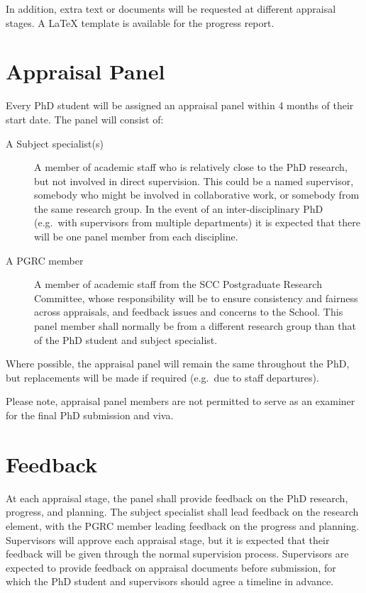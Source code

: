\documentclass[12pt,a4paper]{article}
\begin{document}
In addition, extra text or documents will be requested at different appraisal stages. A \LaTeX{} template is available for the progress report.

\section{Appraisal Panel}
Every PhD student will be assigned an appraisal panel within 4 months of their start date. The panel will consist of:
\begin{description}
	\item[A Subject specialist(s)] A member of academic staff who is relatively close to the PhD research, but not involved in direct supervision. This could be a named supervisor, somebody who might be involved in collaborative work, or somebody from the same research group. In the event of an inter-disciplinary PhD (e.g.\ with supervisors from multiple departments) it is expected that there will be one panel member from each discipline.
	\item[A PGRC member] A member of academic staff from the SCC Postgraduate Research Committee, whose responsibility will be to ensure consistency and fairness across appraisals, and feedback issues and concerns to the School. This panel member shall normally be from a different research group than that of the PhD student and subject specialist.
\end{description}

Where possible, the appraisal panel will remain the same throughout the PhD, but replacements will be made if required (e.g.\ due to staff departures).

Please note, appraisal panel members are not permitted to serve as an examiner for the final PhD submission and viva.


\section{Feedback}
At each appraisal stage, the panel shall provide feedback on the PhD research, progress, and planning. The subject specialist shall lead feedback on the research element, with the PGRC member leading feedback on the progress and planning. Supervisors will approve each appraisal stage, but it is expected that their feedback will be given through the normal supervision process. Supervisors are expected to provide feedback on appraisal documents before submission, for which the PhD student and supervisors should agree a timeline in advance.
\end{document}
